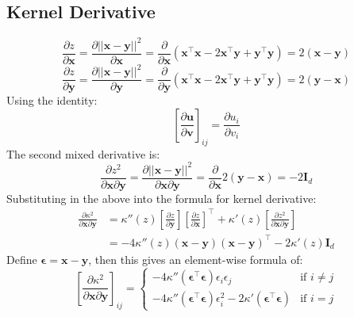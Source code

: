 \documentclass[12pt, a4paper]{article}
\begin{document}
\subsection{Kernel Derivative}
\begin{equation*}
    \frac{\partial z}{\partial \mathbf{x}}
    = \frac{\partial ||\mathbf{x}-\mathbf{y}||^2}{\partial \mathbf{x}}
    = \frac{\partial}{\partial \mathbf{x}} \left(\mathbf{x}^\intercal\mathbf{x} - 2\mathbf{x}^{\intercal}\mathbf{y} + \mathbf{y}^\intercal\mathbf{y}\right)
    =2 (\mathbf{x} - \mathbf{y})
\end{equation*}
\begin{equation*}
    \frac{\partial z}{\partial \mathbf{y}}
    = \frac{\partial ||\mathbf{x}-\mathbf{y}||^2}{\partial \mathbf{y}}
    = \frac{\partial}{\partial \mathbf{y}} \left(\mathbf{x}^\intercal\mathbf{x} - 2\mathbf{x}^{\intercal}\mathbf{y} + \mathbf{y}^\intercal\mathbf{y}\right)
    =2 (\mathbf{y} - \mathbf{x})
\end{equation*}
Using the identity:
\begin{equation*}
    \left[\frac{\partial \mathbf{u}}{\partial \mathbf{v}}\right]_{ij}
    = \frac{\partial u_i}{\partial v_i}
\end{equation*}
The second mixed derivative is:
\begin{equation*}
    \frac{\partial z^2}{\partial \mathbf{x} \partial\mathbf{y}}
    = \frac{\partial ||\mathbf{x}-\mathbf{y}||^2}{\partial \mathbf{x} \partial\mathbf{y}}
    = \frac{\partial}{\partial \mathbf{x}}  2 (\mathbf{y} - \mathbf{x})
    = -2\mathbf{I}_d
\end{equation*}
Substituting in the above into the formula for kernel derivative:
\begin{align*}
    \frac{\partial \kappa^2}{\partial \mathbf{x} \partial \mathbf{y}}
    &= \kappa''(z)\left[\frac{\partial z}{\partial \mathbf{y}}\right]
    \left[\frac{\partial z}{\partial \mathbf{x}}\right]^{\intercal}
    + \kappa'(z)\left[\frac{\partial z^2}{\partial \mathbf{x} \partial \mathbf{y}}\right]\\
    &= -4\kappa''(z)(\mathbf{x} - \mathbf{y})(\mathbf{x} - \mathbf{y})^{\intercal}
    - 2 \kappa'(z)\mathbf{I}_d
\end{align*}
Define $\bm{\epsilon} = \mathbf{x} - \mathbf{y}$, then this gives an element-wise formula of:
\begin{equation*}
    \left[\frac{\partial \kappa^2}{\partial \mathbf{x} \partial \mathbf{y}}\right]_{ij}
    = \begin{cases}
        -4\kappa''(\bm{\epsilon}^\intercal\bm{\epsilon})\epsilon_i \epsilon_j & \text{if } i \neq j\\
        -4\kappa''(\bm{\epsilon}^\intercal\bm{\epsilon})\epsilon_i^2 - 2\kappa'(\bm{\epsilon}^\intercal\bm{\epsilon}) & \text{if } i = j
    \end{cases}
\end{equation*}
\end{document}
